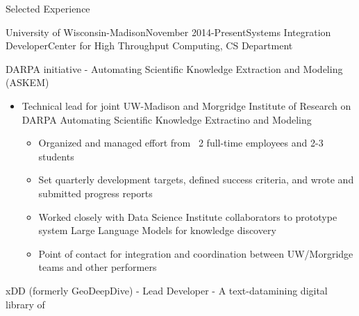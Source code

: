 \documentclass{resume} %
\begin{document}

\begin{rSection}{Selected Experience}




\begin{rSubsection}{University of Wisconsin-Madison}{November
    2014-Present}{Systems Integration Developer}{Center for High Throughput
    Computing, CS Department}
\item DARPA initiative - Automating Scientific Knowledge Extraction and Modeling (ASKEM)
    \begin{itemize}{}{\leftmargin=1.5em} 
      \renewcommand\labelitemi{$\cdot$}
      \item Technical lead for joint UW-Madison and Morgridge Institute of Research on DARPA Automating Scientific Knowledge Extractino and Modeling
        \begin{itemize}{}{\leftmargin=1.25em} 
          \itemsep -0.3em \vspace{-0.3em} %
          \item Organized and managed effort from ~2 full-time employees and 2-3 students 
          \item Set quarterly development targets, defined success criteria, and
              wrote and submitted progress reports
          \item Worked closely with Data Science Institute collaborators to
              prototype system Large Language Models for knowledge discovery
          \item Point of contact for integration and coordination between
              UW/Morgridge teams and other performers
        \end{itemize}
    \end{itemize}
\item xDD (formerly GeoDeepDive) - Lead Developer - A text-datamining digital library of

\end{rSubsection}
\end{rSection}
\end{document}
